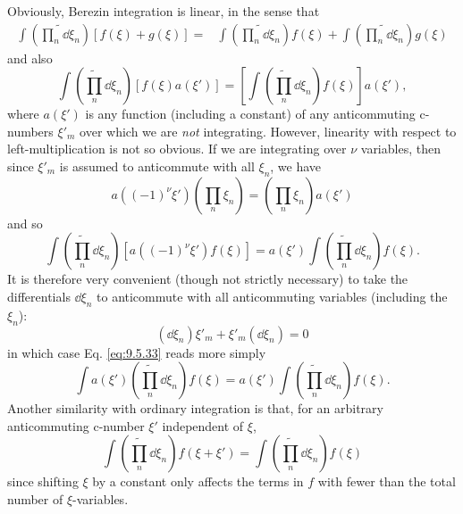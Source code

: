 Obviously, Berezin integration is linear, in the sense that
\begin{align}
\int\left(\widetilde{\prod_n}\dd\xi_n\right)[f(\xi)+g(\xi)]
={}&\int\left(\widetilde{\prod_n}\dd\xi_n\right)f(\xi)
+\int\left(\widetilde{\prod_n}\dd\xi_n\right)g(\xi)
\tag{9.5.31}\label{eq:9.5.31}
\end{align}
and also
\begin{equation}
\int\left(\widetilde{\prod_n}\dd\xi_n\right)[f(\xi)a(\xi')]
=\left[\int\left(\widetilde{\prod_n}\dd\xi_n\right)f(\xi)\right]a(\xi'),
\tag{9.5.32}\label{eq:9.5.32}
\end{equation}
where $a(\xi')$ is any function (including a constant) of any anticommuting
c-numbers $\xi'_m$ over which we are \emph{not} integrating. However, linearity
with respect to left-multiplication is not so obvious. If we are integrating
over $\nu$ variables, then since $\xi'_m$ is assumed to anticommute with all
$\xi_n$, we have
\[
a((-1)^\nu\xi')\left(\prod_n\xi_n\right)
=\left(\prod_n\xi_n\right)a(\xi')
\]
and so
\begin{equation}
\int\left(\widetilde{\prod_n}\dd\xi_n\right)
[a((-1)^\nu\xi')f(\xi)]
=a(\xi')\int\left(\widetilde{\prod_n}\dd\xi_n\right)f(\xi).
\tag{9.5.33}\label{eq:9.5.33}
\end{equation}
It is therefore very convenient (though not strictly necessary) to take the
differentials $\dd\xi_n$ to anticommute with all anticommuting variables
(including the $\xi_n$):
\begin{equation}
(\dd\xi_n)\xi'_m+\xi'_m(\dd\xi_n)=0
\tag{9.5.34}\label{eq:9.5.34}
\end{equation}
in which case Eq. \eqref{eq:9.5.33} reads more simply
\begin{equation}
\int a(\xi')\left(\widetilde{\prod_n}\dd\xi_n\right)f(\xi)
=a(\xi')\int\left(\widetilde{\prod_n}\dd\xi_n\right)f(\xi).
\tag{9.5.35}\label{eq:9.5.35}
\end{equation}
Another similarity with ordinary integration is that, for an arbitrary
anticommuting c-number $\xi'$ independent of $\xi$,
\begin{equation}
\int\left(\widetilde{\prod_n}\dd\xi_n\right)f(\xi+\xi')
=\int\left(\widetilde{\prod_n}\dd\xi_n\right)f(\xi)
\tag{9.5.36}\label{eq:9.5.36}
\end{equation}
since shifting $\xi$ by a constant only affects the terms in $f$ with fewer
than the total number of $\xi$-variables.

